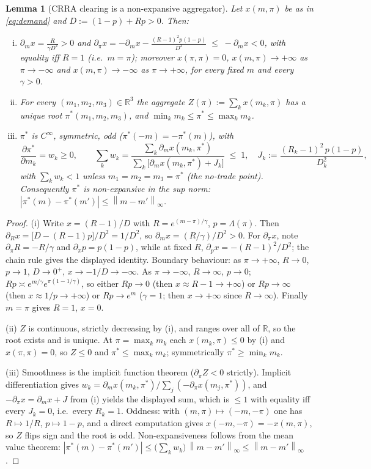 \documentclass[11pt]{article}
\newtheorem{lemma}{Lemma}
\theoremstyle{definition}
\newcommand{\R}{\mathbb{R}}
\newcommand{\Lam}{\Lambda}
\newcommand{\norm}[1]{\left\lVert #1 \right\rVert}
\begin{document}
\begin{lemma}[CRRA clearing is a non-expansive aggregator]\label{lem:clearing}
Let $x(m,\pi)$ be as in \eqref{eq:demand} and $D:=(1-p)+Rp>0$. Then:
\begin{enumerate}[(i)]
\item $\displaystyle \partial_m x=\frac{R}{\gamma D^2}>0$ and
$\displaystyle \partial_\pi x=-\partial_m x-\frac{(R-1)^2p(1-p)}{D^2}
\;\le\;-\partial_m x<0$, with equality iff $R=1$ (i.e.\ $m=\pi$);
moreover $x(\pi,\pi)=0$, $x(m,\pi)\to+\infty$ as $\pi\to-\infty$ and
$x(m,\pi)\to-\infty$ as $\pi\to+\infty$, for every fixed $m$ and every
$\gamma>0$.
\item For every $(m_1,m_2,m_3)\in\R^3$ the aggregate
$Z(\pi):=\sum_k x(m_k,\pi)$ has a unique root
$\pi^*(m_1,m_2,m_3)$, and
$\min_k m_k\le \pi^*\le\max_k m_k$.
\item $\pi^*$ is $C^\infty$, symmetric, odd
($\pi^*(-m)=-\pi^*(m)$), with
\[
\frac{\partial\pi^*}{\partial m_k}=w_k\ge0,
\qquad
\sum_{k}w_k
=\frac{\sum_k \partial_m x(m_k,\pi^*)}
{\sum_k\big[\partial_m x(m_k,\pi^*)+J_k\big]}\;\le\;1,
\quad
J_k:=\frac{(R_k-1)^2\,p(1-p)}{D_k^2},
\]
with $\sum_k w_k<1$ unless $m_1=m_2=m_3=\pi^*$ (the no-trade point).
Consequently $\pi^*$ is non-expansive in the sup norm:
$|\pi^*(m)-\pi^*(m')|\le\norm{m-m'}_\infty$.
\end{enumerate}
\end{lemma}

\begin{proof}
(i) Write $x=(R-1)/D$ with $R=e^{(m-\pi)/\gamma}$, $p=\Lam(\pi)$. Then
$\partial_R x=\big[D-(R-1)p\big]/D^2=1/D^2$, so
$\partial_m x=(R/\gamma)/D^2>0$. For $\partial_\pi x$, note
$\partial_\pi R=-R/\gamma$ and $\partial_\pi p=p(1-p)$, while at fixed $R$,
$\partial_p x=-(R-1)^2/D^2$; the chain rule gives the displayed identity.
Boundary behaviour: as $\pi\to+\infty$, $R\to0$, $p\to1$, $D\to0^+$,
$x\to-1/D\to-\infty$. As $\pi\to-\infty$, $R\to\infty$, $p\to0$;
$Rp\asymp e^{m/\gamma}e^{\pi(1-1/\gamma)}$, so either $Rp\to0$ (then
$x\approx R-1\to+\infty$) or $Rp\to\infty$ (then $x\approx 1/p\to+\infty$)
or $Rp\to e^{m}$ ($\gamma=1$; then $x\to+\infty$ since $R\to\infty$).
Finally $m=\pi$ gives $R=1$, $x=0$.

(ii) $Z$ is continuous, strictly decreasing by (i), and ranges over all of
$\R$, so the root exists and is unique. At $\pi=\max_k m_k$ each
$x(m_k,\pi)\le0$ by (i) and $x(\pi,\pi)=0$, so $Z\le0$ and
$\pi^*\le\max_k m_k$; symmetrically $\pi^*\ge\min_k m_k$.

(iii) Smoothness is the implicit function theorem
($\partial_\pi Z<0$ strictly). Implicit differentiation gives
$w_k=\partial_m x(m_k,\pi^*)\big/\sum_j(-\partial_\pi x(m_j,\pi^*))$, and
$-\partial_\pi x=\partial_m x+J$ from (i) yields the displayed sum, which is
$\le1$ with equality iff every $J_k=0$, i.e.\ every $R_k=1$. Oddness: with
$(m,\pi)\mapsto(-m,-\pi)$ one has $R\mapsto 1/R$, $p\mapsto1-p$, and a direct
computation gives $x(-m,-\pi)=-x(m,\pi)$, so $Z$ flips sign and the root is
odd. Non-expansiveness follows from the mean value theorem:
$|\pi^*(m)-\pi^*(m')|\le\big(\sum_k w_k\big)\,\norm{m-m'}_\infty
\le\norm{m-m'}_\infty$.
\end{proof}
\end{document}

